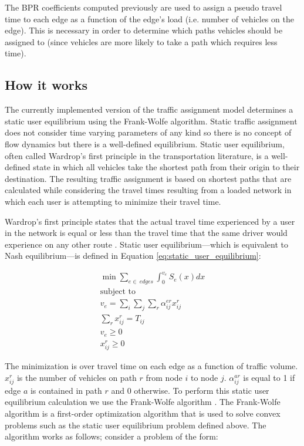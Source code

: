 The BPR coefficients computed previously are used to assign a pseudo travel time to each edge as a function of the edge's load (i.e. number of vehicles on the edge). This is necessary in order to determine which paths vehicles should be assigned to (since vehicles are more likely to take a path which requires less time).

\subsection{How it works}

The currently implemented version of the traffic assignment model determines a static user equilibrium using the Frank-Wolfe algorithm. Static traffic assignment does not consider time varying parameters of any kind so there is no concept of flow dynamics but there is a well-defined equilibrium. Static user equilibrium, often called Wardrop's first principle in the transportation literature, is a well-defined state in which all vehicles take the shortest path from their origin to their destination. The resulting traffic assignment is based on shortest paths that are calculated while considering the travel times resulting from a loaded network in which each user is attempting to minimize their travel time. 

Wardrop's first principle states that the actual travel time experienced by a user in the network is equal or less than the travel time that the same driver would experience on any other route \citep{wardrop1952road}. Static user equilibrium---which is equivalent to Nash equilibrium---is defined in Equation \ref{eq:static_user_equilibrium}:

\begin{equation}
    \label{eq:static_user_equilibrium}
    \begin{split}
    \min \sum_{e\in\ \textit{edges}}\int_{0}^{v_e} S_e(x) dx\\
    \text{subject to} \\ 
    v_e = \sum_i \sum_j \sum_r \alpha_{ij}^{er} x_{ij}^{r}\\
    \sum_r x_{ij}^{r} = T_{ij}\\
    v_e \geq 0 \\
    x_{ij}^{r} \geq 0
    \end{split}
\end{equation}

The minimization is over travel time on each edge as a function of traffic volume. $x_{ij}^{r}$ is the number of vehicles on path $r$ from node $i$ to node $j$. $\alpha_{ij}^{ar}$ is equal to 1 if edge $a$ is contained in path $r$ and 0 otherwise. To perform this static user equilibrium calculation we use the Frank-Wolfe algorithm \citep{frank1956algorithm}. The Frank-Wolfe algorithm is a first-order optimization algorithm that is used to solve convex problems such as the static user equilibrium problem defined above. The algorithm works as follows; consider a problem of the form:

